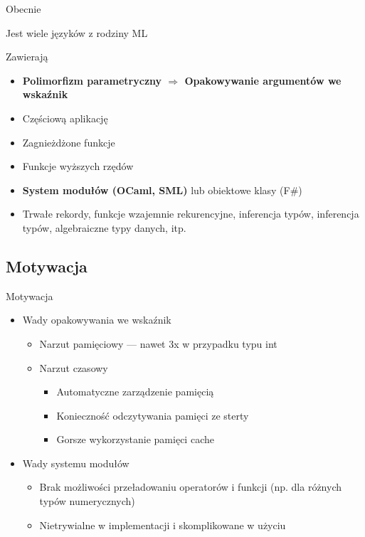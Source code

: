\documentclass{beamer}
\begin{document}
\begin{frame}{Obecnie}
\begin{itemize}
    \item {
        Jest wiele języków z rodziny ML
    \item Zawierają
        \begin{itemize}
            \item \textbf{Polimorfizm parametryczny $\Rightarrow$ Opakowywanie 
            argumentów we wskaźnik}
            \item Częściową aplikację
            \item Zagnieżdżone funkcje 
            \item Funkcje wyższych rzędów 
            \item \textbf{System modułów (OCaml, SML)} lub obiektowe klasy (F\#)
            \item Trwałe rekordy, funkcje wzajemnie rekurencyjne, 
            inferencja typów, 
            inferencja typów, algebraiczne typy danych, itp.
        \end{itemize}
    }
\end{itemize}
\end{frame}

\subsection{Motywacja}

\begin{frame}{Motywacja}
\begin{itemize}
    \item Wady opakowywania we wskaźnik
    \begin{itemize}
        \pause
        \item Narzut pamięciowy --- nawet 3x w przypadku typu int
        \pause
        \item Narzut czasowy 
        \begin{itemize}
            \item Automatyczne zarządzenie pamięcią
            \item Konieczność odczytywania pamięci ze sterty 
            \item Gorsze wykorzystanie pamięci cache
        \end{itemize}
    \end{itemize}

    \pause
    \item Wady systemu modułów
    \begin{itemize}
        \pause
        \item Brak możliwości przeładowaniu operatorów i funkcji (np. dla różnych 
        typów numerycznych)
        \pause
        \item Nietrywialne w implementacji i skomplikowane w użyciu
    \end{itemize}

\end{itemize}
\end{frame}
\end{document}
